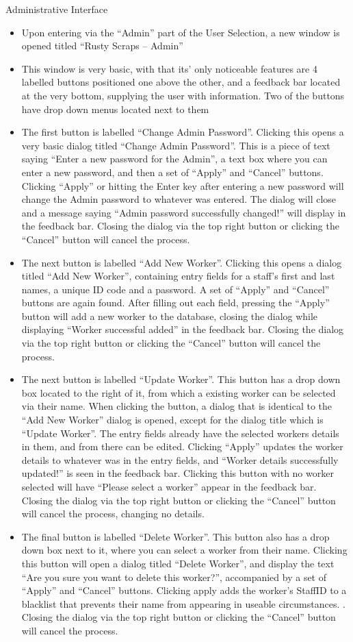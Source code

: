 Administrative Interface
\begin{itemize}
	\item Upon entering via the “Admin” part of the User Selection, a new window is opened titled “Rusty Scraps – Admin”
	\item This window is very basic, with that its’ only noticeable features are 4 labelled buttons positioned one above the other, and a feedback bar located at the very bottom, supplying the user with information. Two of the buttons have drop down menus located next to them
	\item The first button is labelled “Change Admin Password”. Clicking this opens a very basic dialog titled “Change Admin Password”. This is a piece of text saying “Enter a new password for the Admin”, a text box where you can enter a new password, and then a set of “Apply” and “Cancel” buttons. Clicking “Apply” or hitting the Enter key after entering a new password will change the Admin password to whatever was entered. The dialog will close and a message saying “Admin password successfully changed!” will display in the feedback bar. Closing the dialog via the top right button or clicking the “Cancel” button will cancel the process.
	\item The next button is labelled “Add New Worker”. Clicking this opens a dialog titled “Add New Worker”, containing entry fields for a staff’s first and last names, a unique ID code and a password. A set of “Apply” and “Cancel” buttons are again found. After filling out each field, pressing the “Apply” button will add a new worker to the database, closing the dialog while displaying “Worker successful added” in the feedback bar. Closing the dialog via the top right button or clicking the “Cancel” button will cancel the process.
	\item The next button is labelled “Update Worker”. This button has a drop down box located to the right of it, from which a existing worker can be selected via their name. When clicking the button, a dialog that is identical to the “Add New Worker” dialog is opened, except for the dialog title which is “Update Worker”. The entry fields already have the selected workers details in them, and from there can be edited. Clicking “Apply” updates the worker details to whatever was in the entry fields, and “Worker details successfully updated!” is seen in the feedback bar. Clicking this button with no worker selected will have “Please select a worker” appear in the feedback bar. Closing the dialog via the top right button or clicking the “Cancel” button will cancel the process, changing no details.
	\item The final button is labelled “Delete Worker”. This button also has a drop down box next to it, where you can select a worker from their name. Clicking this button will open a dialog titled “Delete Worker”, and display the text “Are you sure you want to delete this worker?”, accompanied by a set of “Apply” and “Cancel” buttons. Clicking apply adds the worker’s StaffID to a blacklist that prevents their name from appearing in useable circumstances. . Closing the dialog via the top right button or clicking the “Cancel” button will cancel the process.
\end{itemize}

